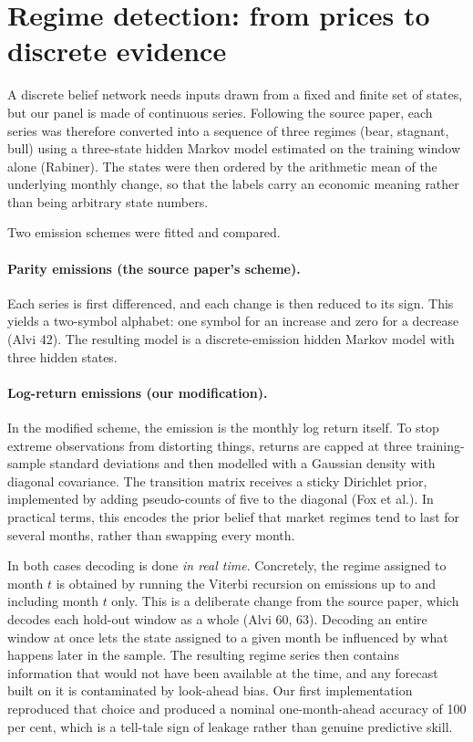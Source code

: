 \documentclass[11pt,a4paper]{article}
\begin{document}
\section{Regime detection: from prices to discrete evidence}
\label{sec:regimes}

A discrete belief network needs inputs drawn from a fixed and finite set of states, but our panel
is made of continuous series. Following the source paper, each series was therefore converted into
a sequence of three regimes (bear, stagnant, bull) using a three-state hidden Markov model
estimated on the training window alone (Rabiner). The states were then ordered by the arithmetic
mean of the underlying monthly change, so that the labels carry an economic meaning rather than
being arbitrary state numbers.

Two emission schemes were fitted and compared.

\paragraph{Parity emissions (the source paper's scheme).} Each series is first differenced, and each
change is then reduced to its sign. This yields a two-symbol alphabet: one symbol for an increase
and zero for a decrease (Alvi 42). The resulting model is a discrete-emission hidden Markov model
with three hidden states.

\paragraph{Log-return emissions (our modification).} In the modified scheme, the emission is the
monthly log return itself. To stop extreme observations from distorting things, returns are capped
at three training-sample standard deviations and then modelled with a Gaussian density with
diagonal covariance. The transition matrix receives a sticky Dirichlet prior, implemented by
adding pseudo-counts of five to the diagonal (Fox et al.). In practical terms, this encodes the
prior belief that market regimes tend to last for several months, rather than swapping every
month.

In both cases decoding is done \textit{in real time}. Concretely, the regime assigned to month
$t$ is obtained by running the Viterbi recursion on emissions up to and including month $t$ only.
This is a deliberate change from the source paper, which decodes each hold-out window as a whole
(Alvi 60, 63). Decoding an entire window at once lets the state assigned to a given month be
influenced by what happens later in the sample. The resulting regime series then contains
information that would not have been available at the time, and any forecast built on it is
contaminated by look-ahead bias. Our first implementation reproduced that choice and produced a
nominal one-month-ahead accuracy of 100 per cent, which is a tell-tale sign of leakage rather
than genuine predictive skill.
\end{document}

